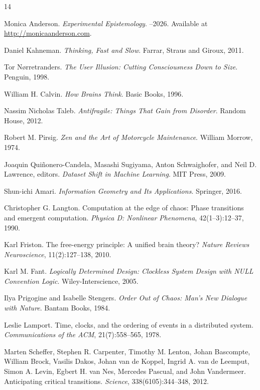 \documentclass[11pt]{article}
\theoremstyle{remark}
\begin{document}
\newpage
\begin{thebibliography}{14}

Monica Anderson.
\newblock \emph{Experimental Epistemology}.
--2026. Available at \url{http://monicaanderson.com}.

Daniel Kahneman.
\newblock \emph{Thinking, Fast and Slow}.
\newblock Farrar, Straus and Giroux, 2011.

Tor N{\o}rretranders.
\newblock \emph{The User Illusion: Cutting Consciousness Down to Size}.
\newblock Penguin, 1998.

William H. Calvin.
\newblock \emph{How Brains Think}.
\newblock Basic Books, 1996.

Nassim Nicholas Taleb.
\newblock \emph{Antifragile: Things That Gain from Disorder}.
\newblock Random House, 2012.

Robert M. Pirsig.
\newblock \emph{Zen and the Art of Motorcycle Maintenance}.
\newblock William Morrow, 1974.

Joaquin Qui{\~n}onero-Candela, Masashi Sugiyama, Anton Schwaighofer, and Neil D. Lawrence, editors.
\newblock \emph{Dataset Shift in Machine Learning}.
\newblock MIT Press, 2009.

Shun-ichi Amari.
\newblock \emph{Information Geometry and Its Applications}.
\newblock Springer, 2016.

Christopher G. Langton.
\newblock Computation at the edge of chaos: Phase transitions and emergent computation.
\newblock \emph{Physica D: Nonlinear Phenomena}, 42(1--3):12--37, 1990.

Karl Friston.
\newblock The free-energy principle: A unified brain theory?
\newblock \emph{Nature Reviews Neuroscience}, 11(2):127--138, 2010.

Karl M. Fant.
\newblock \emph{Logically Determined Design: Clockless System Design with NULL Convention Logic}.
\newblock Wiley-Interscience, 2005.

Ilya Prigogine and Isabelle Stengers.
\newblock \emph{Order Out of Chaos: Man's New Dialogue with Nature}.
\newblock Bantam Books, 1984.

Leslie Lamport.
\newblock Time, clocks, and the ordering of events in a distributed system.
\newblock \emph{Communications of the ACM}, 21(7):558--565, 1978.

Marten Scheffer, Stephen R. Carpenter, Timothy M. Lenton, Johan Bascompte, William Brock, Vasilis Dakos, Johan van de Koppel, Ingrid A. van de Leemput, Simon A. Levin, Egbert H. van Nes, Mercedes Pascual, and John Vandermeer.
\newblock Anticipating critical transitions.
\newblock \emph{Science}, 338(6105):344--348, 2012.

\end{thebibliography}
\end{document}
